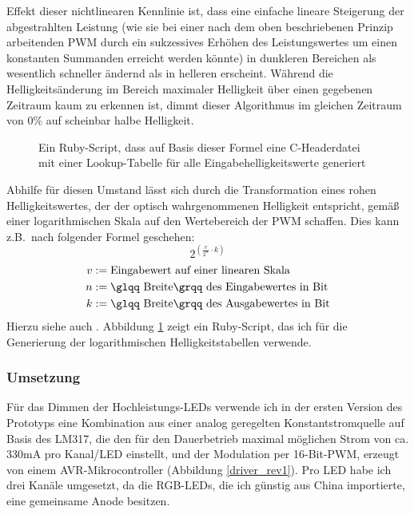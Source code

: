 \documentclass[12pt,a4paper,notitlepage]{article}
\begin{document}
Effekt dieser nichtlinearen Kennlinie ist, dass eine einfache lineare Steigerung der abgestrahlten Leistung (wie sie bei einer nach dem oben beschriebenen Prinzip arbeitenden \gls{PWM} durch ein sukzessives Erhöhen des Leistungswertes um einen konstanten Summanden erreicht werden könnte) in dunkleren Bereichen als wesentlich schneller ändernd als in helleren erscheint. Während die Helligkeitsänderung im Bereich maximaler Helligkeit über einen gegebenen Zeitraum kaum zu erkennen ist, dimmt dieser Algorithmus im gleichen Zeitraum von $0\%$ auf scheinbar halbe Helligkeit.

\begin{figure}

\caption{Ein Ruby-Script, dass auf Basis dieser Formel eine C-Headerdatei mit einer Lookup-Tabelle für alle Eingabehelligkeitswerte generiert}
\label{log_lut_gen}
\end{figure}

Abhilfe für diesen Umstand lässt sich durch die Transformation eines rohen Helligkeitswertes, der der optisch wahrgenommenen Helligkeit entspricht, gemäß einer logarithmischen Skala auf den Wertebereich der \gls{PWM} schaffen. Dies kann z.B.\ nach folgender Formel geschehen:
\begin{equation}
2^{\left(\frac{v}{2^n}\cdot k\right)}
\end{equation}
\begin{align}
v&:=\text{Eingabewert auf einer linearen Skala}\\
n&:=\text{\glqq Breite\grqq\ des Eingabewertes in Bit}\\
k&:=\text{\glqq Breite\grqq\  des Ausgabewertes in Bit}
\end{align}
Hierzu siehe auch \cite{MAXIM41,MAXIM57,SIART1}. Abbildung \ref{log_lut_gen} %
zeigt ein Ruby-Script, das ich für die Generierung der logarithmischen Helligkeitstabellen verwende.

\subsubsection{Umsetzung}
Für das Dimmen der Hochleistungs-LEDs verwende ich in der ersten Version des Prototyps eine Kombination aus einer analog geregelten Konstantstromquelle auf Basis des LM317\cite{NATIONAL3}, die den für den Dauerbetrieb maximal möglichen Strom von ca. 330mA pro Kanal/LED einstellt, und der Modulation per 16-Bit-PWM, erzeugt von einem AVR-Mikrocontroller (Abbildung \ref{driver_rev1}).
Pro LED habe ich drei Kanäle umgesetzt, da die RGB-LEDs, die ich günstig aus China importierte, %
eine gemeinsame Anode besitzen.
\end{document}
